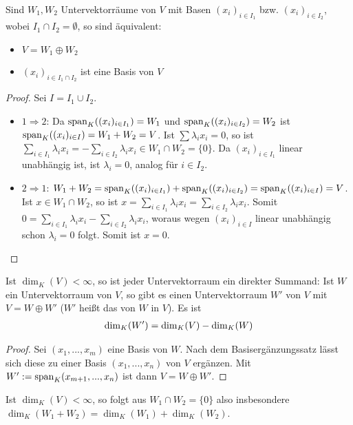 \begin{proposition}
	Sind $W_1,W_2$ Untervektorräume von $V$ mit Basen $(x_i)_{i\in I_1}$ bzw. $(x_i)_{i\in I_2}$, wobei $I_1 \cap 
	I_2 = \emptyset$, so sind äquivalent:
	\begin{itemize}
		\item $V=W_1 \oplus W_2$
		\item $(x_i)_{i\in I_1 \cap I_2}$ ist eine Basis von $V$
	\end{itemize}
\end{proposition}
\begin{proof}
	Sei $I=I_1 \cup I_2$.
	\begin{itemize}
		\item $1\Rightarrow 2$: Da $\operatorname{span}_K((x_i)_{i\in I_1})=W_1$ und $\operatorname{span}_K((x_i)_{i\in I_2})=W_2$ ist $\operatorname{span}_K((x_i)
		_{i\in I})=W_1+W_2=V$. Ist $\sum \lambda_ix_i=0$, so ist $\sum_{i\in I_1} \lambda_ix_i = -\sum
		_{i\in I_2} \lambda_ix_i \in W_1 \cap W_2 = \{0\}$. Da $(x_i)_{i\in I_1}$ linear unabhängig ist, ist 
		$\lambda_i=0$, analog für $i\in I_2$.
		\item $2\Rightarrow 1$: $W_1+W_2=\operatorname{span}_K((x_i)_{i\in I_1})+\operatorname{span}_K((x_i)_{i\in I_2})=\operatorname{span}_K((x_i)_{i\in I})=V$. Ist 
		$x\in W_1 \cap W_2$, so ist $x=\sum_{i\in I_1} \lambda_ix_i = \sum_{i\in I_2} \lambda_ix_i$. Somit 
		$0=\sum_{i\in I_1} \lambda_ix_i - \sum_{i\in I_2} \lambda_ix_i$, woraus wegen $(x_i)_{i\in I}$ 
		linear unabhängig schon $\lambda_i=0$ folgt. Somit ist $x=0$.
	\end{itemize}
\end{proof}

\begin{conclusion}
	Ist $\dim_K(V)<\infty$, so ist jeder Untervektorraum ein direkter Summand: Ist $W$ ein Untervektorraum von $V$, so 
	gibt es einen Untervektorraum $W'$ von $V$ mit $V=W\oplus W'$ ($W'$ heißt das  von $W$ in $V$). Es 
	ist
	\begin{align}
		\dim_K(W')=\dim_K(V)-\dim_K(W)\notag
	\end{align}
\end{conclusion}
\begin{proof}
	Sei $(x_1,...,x_m)$ eine Basis von $W$. Nach dem Basisergänzungssatz lässt sich diese zu einer Basis $(x_1,...,x_n)$ 
	von $V$ ergänzen. Mit $W':= \operatorname{span}_K(x_{m+1},...,x_n)$ ist dann $V=W\oplus W'$.
\end{proof}

\begin{remark}
	Ist $\dim_K(V)<\infty$, so folgt aus $W_1\cap W_2=\{0\}$ also insbesondere $\dim_K(W_1+W_2)=
	\dim_K(W_1)+\dim_K(W_2)$. 
\end{remark}

